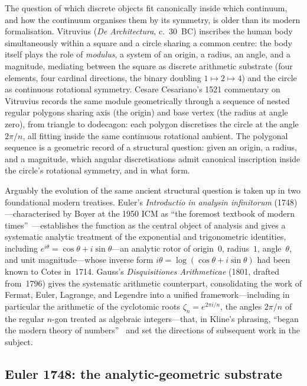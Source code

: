 \documentclass[11pt]{amsart}
\theoremstyle{definition}
\begin{document}
The question of which discrete objects fit canonically inside which
continuum, and how the continuum organises them by its symmetry, is
older than its modern formalisation.  Vitruvius (\emph{De
Architectura}, c.~30~BC) inscribes the human body simultaneously
within a square and a circle sharing a common centre: the body itself
plays the role of \emph{modulus}, a system of an origin, a radius, an
angle, and a magnitude, mediating between the square as discrete
arithmetic substrate (four elements, four cardinal directions, the
binary doubling $1\mapsto 2\mapsto 4$) and the circle as continuous
rotational symmetry.  Cesare Cesariano's 1521 commentary on Vitruvius
records the same module geometrically through a sequence of nested
regular polygons sharing axis (the origin) and base vertex (the
radius at angle zero), from triangle to dodecagon: each polygon
discretises the circle at the angle $2\pi/n$, all fitting inside the
same continuous rotational ambient.  The polygonal sequence is a
geometric record of a structural question: given an origin, a radius,
and a magnitude, which angular discretisations admit canonical
inscription inside the circle's rotational symmetry, and in what form.

Arguably the evolution of the same ancient structural question is
taken up in two foundational modern treatises.  Euler's
\emph{Introductio in analysin infinitorum} (1748)---characterised by
Boyer at the 1950 ICM as ``the foremost textbook of modern
times''~\cite{boyer-1951}---establishes the function as the central
object of analysis and gives a systematic analytic treatment of the
exponential and trigonometric identities, including
$e^{i\theta}=\cos\theta+i\sin\theta$---an analytic rotor of origin~$0$,
radius~$1$, angle~$\theta$, and unit magnitude---whose inverse form
$i\theta=\log(\cos\theta+i\sin\theta)$ had been known to Cotes
in~1714.  Gauss's \emph{Disquisitiones Arithmeticae} (1801, drafted
from~1796) gives the systematic arithmetic counterpart, consolidating
the work of Fermat, Euler, Lagrange, and Legendre into a unified
framework---including in particular the arithmetic of the cyclotomic
roots $\zeta_{n}=e^{2\pi i/n}$, the angles $2\pi/n$ of the regular
$n$-gon treated as algebraic integers---that, in Kline's phrasing,
``began the modern theory of numbers''~\cite{kline-1972} and set the
directions of subsequent work in the subject.

\subsection{Euler 1748: the analytic-geometric substrate}
\label{ssec:euler-substrate}
\end{document}
